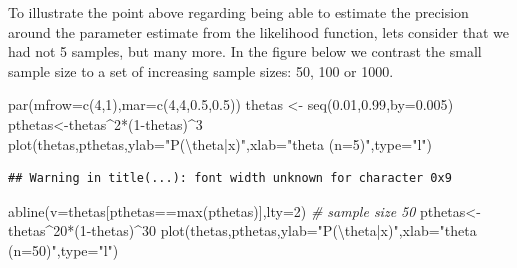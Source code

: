 \documentclass[
]{book}
\newenvironment{Shaded}{\begin{snugshade}}{\end{snugshade}}
\newcommand{\AttributeTok}[1]{\textcolor[rgb]{0.77,0.63,0.00}{#1}}
\newcommand{\CommentTok}[1]{\textcolor[rgb]{0.56,0.35,0.01}{\textit{#1}}}
\newcommand{\DecValTok}[1]{\textcolor[rgb]{0.00,0.00,0.81}{#1}}
\newcommand{\FloatTok}[1]{\textcolor[rgb]{0.00,0.00,0.81}{#1}}
\newcommand{\FunctionTok}[1]{\textcolor[rgb]{0.00,0.00,0.00}{#1}}
\newcommand{\NormalTok}[1]{#1}
\newcommand{\OtherTok}[1]{\textcolor[rgb]{0.56,0.35,0.01}{#1}}
\newcommand{\SpecialCharTok}[1]{\textcolor[rgb]{0.00,0.00,0.00}{#1}}
\newcommand{\StringTok}[1]{\textcolor[rgb]{0.31,0.60,0.02}{#1}}
\begin{document}
To illustrate the point above regarding being able to estimate the precision around the parameter estimate from the likelihood function, lets consider that we had not 5 samples, but many more. In the figure below we contrast the small sample size to a set of increasing sample sizes: 50, 100 or 1000.

\begin{Shaded}
\begin{Highlighting}[]
\FunctionTok{par}\NormalTok{(}\AttributeTok{mfrow=}\FunctionTok{c}\NormalTok{(}\DecValTok{4}\NormalTok{,}\DecValTok{1}\NormalTok{),}\AttributeTok{mar=}\FunctionTok{c}\NormalTok{(}\DecValTok{4}\NormalTok{,}\DecValTok{4}\NormalTok{,}\FloatTok{0.5}\NormalTok{,}\FloatTok{0.5}\NormalTok{))}
\NormalTok{thetas }\OtherTok{\textless{}{-}} \FunctionTok{seq}\NormalTok{(}\FloatTok{0.01}\NormalTok{,}\FloatTok{0.99}\NormalTok{,}\AttributeTok{by=}\FloatTok{0.005}\NormalTok{)}
\NormalTok{pthetas}\OtherTok{\textless{}{-}}\NormalTok{thetas}\SpecialCharTok{\^{}}\DecValTok{2}\SpecialCharTok{*}\NormalTok{(}\DecValTok{1}\SpecialCharTok{{-}}\NormalTok{thetas)}\SpecialCharTok{\^{}}\DecValTok{3}
\FunctionTok{plot}\NormalTok{(thetas,pthetas,}\AttributeTok{ylab=}\StringTok{"P(}\SpecialCharTok{\textbackslash{}t}\StringTok{heta|x)"}\NormalTok{,}\AttributeTok{xlab=}\StringTok{"theta (n=5)"}\NormalTok{,}\AttributeTok{type=}\StringTok{"l"}\NormalTok{)}
\end{Highlighting}
\end{Shaded}

\begin{verbatim}
## Warning in title(...): font width unknown for character 0x9
\end{verbatim}

\begin{Shaded}
\begin{Highlighting}[]
\FunctionTok{abline}\NormalTok{(}\AttributeTok{v=}\NormalTok{thetas[pthetas}\SpecialCharTok{==}\FunctionTok{max}\NormalTok{(pthetas)],}\AttributeTok{lty=}\DecValTok{2}\NormalTok{)}
\CommentTok{\# sample size 50}
\NormalTok{pthetas}\OtherTok{\textless{}{-}}\NormalTok{thetas}\SpecialCharTok{\^{}}\DecValTok{20}\SpecialCharTok{*}\NormalTok{(}\DecValTok{1}\SpecialCharTok{{-}}\NormalTok{thetas)}\SpecialCharTok{\^{}}\DecValTok{30}
\FunctionTok{plot}\NormalTok{(thetas,pthetas,}\AttributeTok{ylab=}\StringTok{"P(}\SpecialCharTok{\textbackslash{}t}\StringTok{heta|x)"}\NormalTok{,}\AttributeTok{xlab=}\StringTok{"theta  (n=50)"}\NormalTok{,}\AttributeTok{type=}\StringTok{"l"}\NormalTok{)}
\end{Highlighting}
\end{Shaded}
\end{document}
